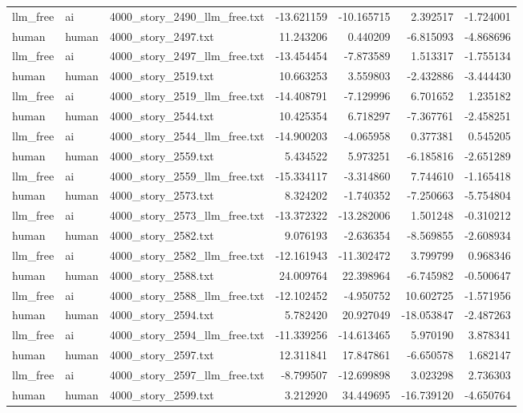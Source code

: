 \begin{longtable}{lllrrrr}
llm\_free & ai & 4000\_story\_2490\_llm\_free.txt & -13.621159 & -10.165715 & 2.392517 & -1.724001 \\
human & human & 4000\_story\_2497.txt & 11.243206 & 0.440209 & -6.815093 & -4.868696 \\
llm\_free & ai & 4000\_story\_2497\_llm\_free.txt & -13.454454 & -7.873589 & 1.513317 & -1.755134 \\
human & human & 4000\_story\_2519.txt & 10.663253 & 3.559803 & -2.432886 & -3.444430 \\
llm\_free & ai & 4000\_story\_2519\_llm\_free.txt & -14.408791 & -7.129996 & 6.701652 & 1.235182 \\
human & human & 4000\_story\_2544.txt & 10.425354 & 6.718297 & -7.367761 & -2.458251 \\
llm\_free & ai & 4000\_story\_2544\_llm\_free.txt & -14.900203 & -4.065958 & 0.377381 & 0.545205 \\
human & human & 4000\_story\_2559.txt & 5.434522 & 5.973251 & -6.185816 & -2.651289 \\
llm\_free & ai & 4000\_story\_2559\_llm\_free.txt & -15.334117 & -3.314860 & 7.744610 & -1.165418 \\
human & human & 4000\_story\_2573.txt & 8.324202 & -1.740352 & -7.250663 & -5.754804 \\
llm\_free & ai & 4000\_story\_2573\_llm\_free.txt & -13.372322 & -13.282006 & 1.501248 & -0.310212 \\
human & human & 4000\_story\_2582.txt & 9.076193 & -2.636354 & -8.569855 & -2.608934 \\
llm\_free & ai & 4000\_story\_2582\_llm\_free.txt & -12.161943 & -11.302472 & 3.799799 & 0.968346 \\
human & human & 4000\_story\_2588.txt & 24.009764 & 22.398964 & -6.745982 & -0.500647 \\
llm\_free & ai & 4000\_story\_2588\_llm\_free.txt & -12.102452 & -4.950752 & 10.602725 & -1.571956 \\
human & human & 4000\_story\_2594.txt & 5.782420 & 20.927049 & -18.053847 & -2.487263 \\
llm\_free & ai & 4000\_story\_2594\_llm\_free.txt & -11.339256 & -14.613465 & 5.970190 & 3.878341 \\
human & human & 4000\_story\_2597.txt & 12.311841 & 17.847861 & -6.650578 & 1.682147 \\
llm\_free & ai & 4000\_story\_2597\_llm\_free.txt & -8.799507 & -12.699898 & 3.023298 & 2.736303 \\
human & human & 4000\_story\_2599.txt & 3.212920 & 34.449695 & -16.739120 & -4.650764 \\

\end{longtable}

